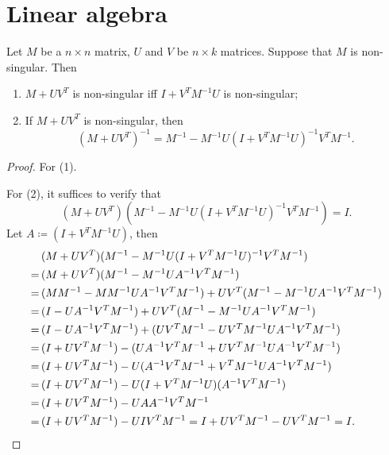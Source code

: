 \section{Linear algebra}

\begin{definition}[Rings]

\end{definition}

\begin{definition}[Fields]

\end{definition}

\begin{theorem}
    Let \(M\) be a \(n \times n\) matrix, \(U\) and \(V\) be \(n \times k\) matrices.
    Suppose that \(M\) is non-singular. 
    Then
    \begin{enumerate}[label = (\arabic*)]
        \item \(M + UV^T\) is non-singular iff \(I + V^TM^{-1}U\) is non-singular;
        \item If \(M + UV^T\) is non-singular, then
        \[
            (M + UV^T)^{-1} = M^{-1} - M^{-1}U(I + V^TM^{-1}U)^{-1}V^TM^{-1}.
        \]
    \end{enumerate}
\end{theorem}

\begin{proof}
    For (1).

    For (2), it suffices to verify that 
    \[
        (M + UV^T)(M^{-1} - M^{-1}U(I + V^TM^{-1}U)^{-1}V^TM^{-1}) = I.
    \]
    Let \(A \coloneqq (I + V^TM^{-1}U)\), then
    \begin{align*}
        &(M + UV^T)(M^{-1} - M^{-1}U(I + V^TM^{-1}U)^{-1}V^TM^{-1})\\
        = \, &(M + UV^T)(M^{-1} - M^{-1}UA^{-1}V^TM^{-1})\\
        = \, &(MM^{-1} - MM^{-1}UA^{-1}V^TM^{-1}) + UV^T(M^{-1} - M^{-1}UA^{-1}V^TM^{-1}) \\
        = \, &(I - UA^{-1}V^TM^{-1}) + UV^T(M^{-1} - M^{-1}UA^{-1}V^TM^{-1}) \\
        = \, &(I - UA^{-1}V^TM^{-1}) + (UV^TM^{-1} - UV^TM^{-1}UA^{-1}V^TM^{-1}) \\
        = \, &(I + UV^TM^{-1}) - (UA^{-1}V^TM^{-1} + UV^TM^{-1}UA^{-1}V^TM^{-1}) \\
        = \, &(I + UV^TM^{-1}) - U(A^{-1}V^TM^{-1} + V^TM^{-1}UA^{-1}V^TM^{-1}) \\
        = \, &(I + UV^TM^{-1}) - U(I + V^TM^{-1}U)(A^{-1}V^TM^{-1}) \\
        = \, &(I + UV^TM^{-1}) - UAA^{-1}V^TM^{-1} \\
        = \, &(I + UV^TM^{-1}) - UIV^TM^{-1} =  I + UV^TM^{-1} - UV^TM^{-1} = I. \qedhere \\
    \end{align*}
\end{proof}

